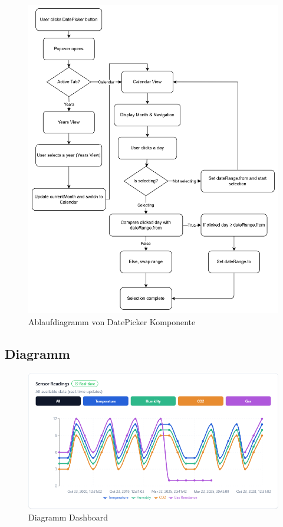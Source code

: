 \begin{inhalt}
\begin{enumerate}[label=\textbf{\arabic*.}]
\begin{figure}[!htb]
\centering
\includegraphics[width=1\textwidth]{files/Thomas/pics/Website/dashbord/dashbaord-datepicker-flowchart.png}
\caption[Ablaufdiagramm von DatePicker Komponente]{Ablaufdiagramm von DatePicker Komponente}
\label{fig:gehaeuse_internet_bild}
\end{figure}


\clearpage

\subsection{Diagramm}

\begin{figure}[!htb]
\centering
\includegraphics[width=1\textwidth]{files/Thomas/pics/Website/dashbord/chart.png}
\caption[Diagramm Dashboard]{Diagramm Dashboard}
\label{fig:Flowchart_Backend}
\end{figure}


\end{enumerate}
\end{inhalt}
